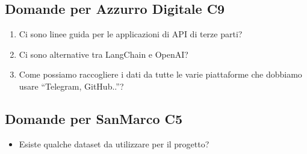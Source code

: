 \documentclass[a4paper,11pt]{article}
\begin{document}
\subsection{Domande per Azzurro Digitale C9}
\begin{enumerate}
    \item Ci sono linee guida per le applicazioni di API di terze parti?
    \item Ci sono alternative tra LangChain e OpenAI?
    \item Come possiamo raccogliere i dati da tutte le varie piattaforme che dobbiamo usare “Telegram, GitHub..”?
\end{enumerate}

\subsection{Domande per SanMarco C5}
\begin{itemize}
    \item Esiste qualche dataset da utilizzare per il progetto?
\end{itemize}
\end{document}
